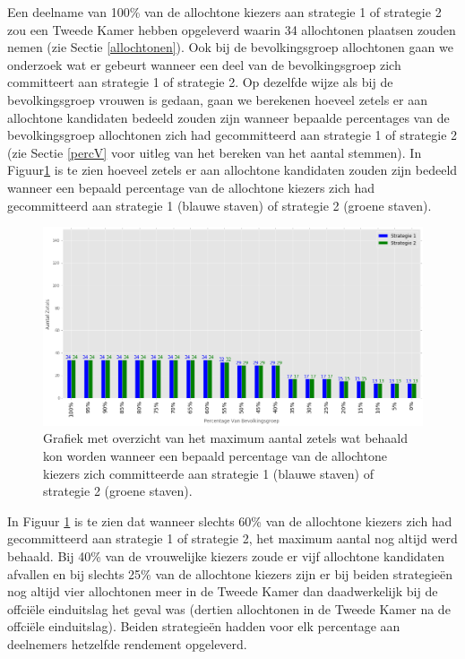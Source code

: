 \indent Een deelname van 100\% van de allochtone kiezers aan strategie 1 of strategie 2 zou een Tweede Kamer hebben opgeleverd waarin 34 allochtonen plaatsen zouden nemen (zie Sectie \ref{allochtonen}). Ook bij de bevolkingsgroep allochtonen gaan we onderzoek wat er gebeurt wanneer een deel van de bevolkingsgroep zich committeert aan strategie 1 of strategie 2. Op dezelfde wijze als bij de bevolkingsgroep vrouwen is gedaan, gaan we berekenen hoeveel zetels er aan allochtone kandidaten bedeeld zouden zijn wanneer bepaalde percentages van de bevolkingsgroep allochtonen zich had gecommitteerd aan strategie 1 of strategie 2 (zie Sectie \ref{percV} voor uitleg van het bereken van het aantal stemmen). In Figuur\ref{fig:PerA} is te zien hoeveel zetels er aan allochtone kandidaten zouden zijn bedeeld wanneer een bepaald percentage van de allochtone kiezers zich had gecommitteerd aan strategie 1 (blauwe staven) of strategie 2 (groene staven).  

\begin{figure}[H]


	\includegraphics[width=\linewidth]{percentages_van_allochtonenS1S2.png}

			\caption{Grafiek met overzicht van het maximum aantal zetels wat behaald kon worden wanneer een bepaald percentage van de allochtone kiezers zich committeerde aan strategie 1 (blauwe staven) of strategie 2 (groene staven).}

\label{fig:PerA}
\end{figure}

In Figuur \ref{fig:PerA} is te zien dat wanneer slechts 60\% van de allochtone kiezers zich had gecommitteerd aan strategie 1 of strategie 2, het maximum aantal nog altijd werd behaald. Bij 40\% van de vrouwelijke kiezers zoude er vijf allochtone kandidaten afvallen en bij slechts 25\% van de allochtone kiezers zijn er bij beiden strategie\"{e}n nog altijd vier allochtonen meer in de Tweede Kamer dan daadwerkelijk bij de offci\"{e}le einduitslag het geval was (dertien allochtonen in de Tweede Kamer na de offci\"{e}le einduitslag). Beiden strategie\"{e}n hadden voor elk percentage aan deelnemers hetzelfde rendement opgeleverd.




